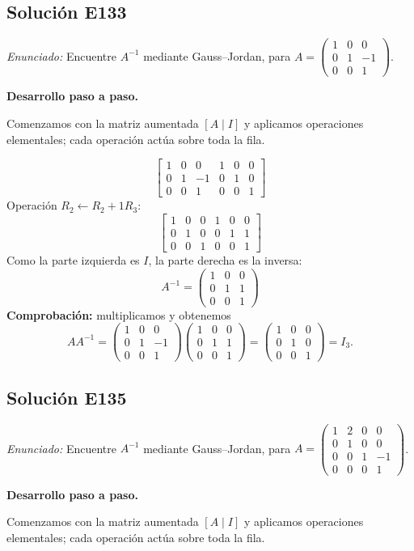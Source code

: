 \documentclass[12pt]{article}
\theoremstyle{remark}
\newcommand{\solucion}[2]{\Needspace{11\baselineskip}\subsection*{Solución E#1}\noindent\textit{Enunciado:} #2\par\medskip\noindent\textbf{Desarrollo paso a paso.}\par\medskip}
\begin{document}
\medskip

\solucion{133}{Encuentre $A^{-1}$ mediante Gauss--Jordan, para $A=\begin{pmatrix}1&0&0\\0&1&-1\\0&0&1\end{pmatrix}$.}
Comenzamos con la matriz aumentada $[A\mid I]$ y aplicamos operaciones elementales; cada operación actúa sobre toda la fila.

\[
\left[\begin{array}{rrr|rrr}1&0&0&1&0&0\\0&1&-1&0&1&0\\0&0&1&0&0&1\end{array}\right]
\]
Operación $R_{2}\leftarrow R_{2}+1R_{3}$:
\[
\left[\begin{array}{rrr|rrr}1&0&0&1&0&0\\0&1&0&0&1&1\\0&0&1&0&0&1\end{array}\right]
\]
Como la parte izquierda es $I$, la parte derecha es la inversa:
\[
\boxed{A^{-1}=\begin{pmatrix}1&0&0\\0&1&1\\0&0&1\end{pmatrix}}
\]
\textbf{Comprobación:} multiplicamos y obtenemos
\[
AA^{-1}=\begin{pmatrix}1&0&0\\0&1&-1\\0&0&1\end{pmatrix}\begin{pmatrix}1&0&0\\0&1&1\\0&0&1\end{pmatrix}=\begin{pmatrix}1&0&0\\0&1&0\\0&0&1\end{pmatrix}=I_{3}.
\]

\medskip

\solucion{135}{Encuentre $A^{-1}$ mediante Gauss--Jordan, para $A=\begin{pmatrix}1&2&0&0\\0&1&0&0\\0&0&1&-1\\0&0&0&1\end{pmatrix}$.}
Comenzamos con la matriz aumentada $[A\mid I]$ y aplicamos operaciones elementales; cada operación actúa sobre toda la fila.
\end{document}
